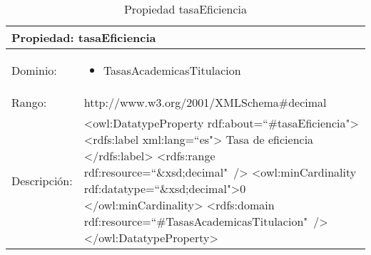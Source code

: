 \begin{table}[!ht]
	\centering
	\begin{tabular}{|p{}|p{}|}
		\hline
		\multicolumn{2}{|l|}{Propiedad: \textbf{tasaEficiencia}}
		\\ \hline
		Dominio:&
		\begin{itemize}
			\item TasasAcademicasTitulacion
		\end{itemize}
		\\ \hline
		Rango:&
		http://www.w3.org/2001/XMLSchema\#decimal
		\\ \hline
		Descripción:&
		\textless owl:DatatypeProperty rdf:about=``\#tasaEficiencia"\textgreater\newline 
		\tab\textless rdfs:label xml:lang=``es"\textgreater\newline
		\tab\tab Tasa de eficiencia\newline
		\tab\textless /rdfs:label\textgreater\newline
		\tab\textless rdfs:range\newline
		\tab\tab rdf:resource=``\&xsd;decimal"\ /\textgreater\newline
		\tab\textless owl:minCardinality \newline
		\tab\tab rdf:datatype=``\&xsd;decimal"\textgreater0\newline
		\tab\textless /owl:minCardinality\textgreater\newline
		\tab\textless rdfs:domain\newline
		\tab\tab rdf:resource=``\#TasasAcademicasTitulacion"\ /\textgreater\newline
		\textless /owl:DatatypeProperty\textgreater
		\\ \hline
	\end{tabular}
	\caption{Propiedad tasaEficiencia}
	\label{propiedad-tasaeficiencia}
\end{table}

